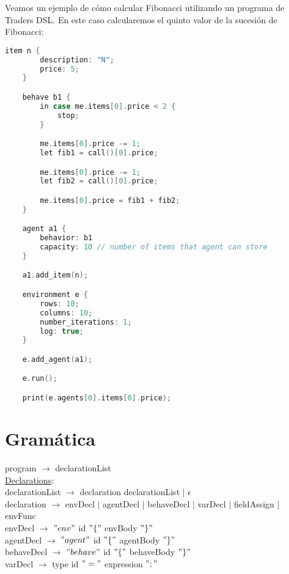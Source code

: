 \documentclass{article}
\begin{document}
Veamos un ejemplo de cómo calcular Fibonacci utilizando un programa de Traders DSL. En este caso calcularemos el quinto valor de la sucesión de Fibonacci:

\begin{lstlisting}[language=c]
	item n {
		description: "N";
		price: 5;
	}	

	behave b1 {
		in case me.items[0].price < 2 {
			stop;
		}

		me.items[0].price -= 1;
		let fib1 = call()[0].price;

		me.items[0].price -= 1;
		let fib2 = call()[0].price;

		me.items[0].price = fib1 + fib2;
	}

	agent a1 {
		behavior: b1
		capacity: 10 // number of items that agent can store
	}

	a1.add_item(n);

	environment e {
		rows: 10;
		columns: 10;
		number_iterations: 1;
		log: true;
	}

	e.add_agent(a1);

	e.run();

	print(e.agents[0].items[0].price);

\end{lstlisting}


\section{Gramática}

program $\rightarrow$ declarationList \\

\underline{Declarations}: \\

declarationList $\rightarrow$ declaration declarationList  $\vert$ $\epsilon$ \\

declaration $\rightarrow$ envDecl $\vert$ agentDecl $\vert$ behaveDecl $\vert$ varDecl $\vert$ fieldAssign $\vert$ envFunc\\

envDecl $\rightarrow$ $"env"$ id $"\{"$ envBody $"\}"$ \\

agentDecl $\rightarrow$ $"agent"$ id $"\{"$ agentBody $"\}"$ \\

behaveDecl $\rightarrow$ $"behave"$ id $"\{"$ behaveBody $"\}"$ \\

varDecl $\rightarrow$ type id $"="$ expression $";"$ \\
\end{document}
